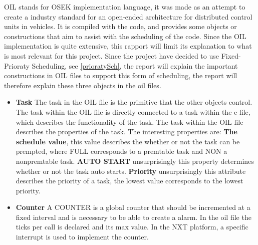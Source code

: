 OIL stands for OSEK implementation language, it was made as an attempt to create a industry standard for an open-ended architecture for distributed control units in vehicles\cite{OILManual}. It is compiled with the code, and provides some objects or constructions that aim to assist with the scheduling of the code. Since the OIL implementation is quite extensive, this rapport will limit its explanation to what is most relevant for this project. Since the project have decided to use Fixed-Prioraty Scheduling, see \ref{prioratySch}, the report will explain the important constructions in OIL files to support this form of scheduling, the report will therefore explain these three objects in the oil files.

\begin{itemize}
    \item{\textbf{Task}}
    The task in the OIL file is the primitive that the other objects control. The task within the OIL file is directly connected to a task within the c file, which describes the functionality of the task. The task within the OIL file describes the properties of the task. The interesting properties are: \textbf{The schedule value}, this value describes the whether or not the task can be prempted, where FULL corresponds to a premtable task and NON a nonpremtable task. \textbf{AUTO START} unsurprisingly this property determines whether or not the task auto starts. 
    \textbf{Priority} unsurprisingly this attribute describes the priority of a task, the lowest value corresponds to the lowest priority.
    \item{\textbf{Counter}}
    A COUNTER is a global counter that should be incremented at a fixed interval and is necessary to be able to create a alarm. In the oil file the ticks per call is declared and its max value. In the NXT platform, a specific interrupt is used to implement the counter. 

\end{itemize}
